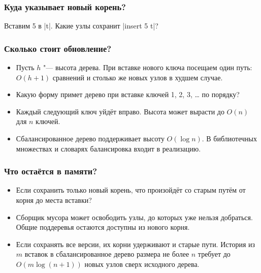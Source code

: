 \documentclass[11pt]{beamer}
\begin{document}
\begin{frame}[fragile]
  \frametitle{Куда указывает новый корень?}
  Вставим 5 в \haskinline|t|. Какие узлы сохранит \haskinline|insert 5 t|?
  \begin{center}
  \end{center}
\end{frame}

\begin{frame}[fragile]
  \frametitle{Сколько стоит обновление?}
  \begin{itemize}
    \item Пусть $h$ "--- высота дерева. При вставке нового ключа посещаем один путь: $O(h+1)$ сравнений и столько же новых узлов в худшем случае.
    \item Какую форму примет дерево при вставке ключей 1, 2, 3, \ldots{} по порядку? \pause
    \item Каждый следующий ключ уйдёт вправо. Высота может вырасти до $O(n)$ для $n$ ключей.
    \item Сбалансированное дерево поддерживает высоту $O(\log n)$. В библиотечных множествах и словарях балансировка входит в реализацию.
  \end{itemize}
\end{frame}

\begin{frame}[fragile]
  \frametitle{Что остаётся в памяти?}
  \begin{itemize}
    \item Если сохранить только новый корень, что произойдёт со старым путём от корня до места вставки? \pause
    \item Сборщик мусора может освободить узлы, до которых уже нельзя добраться. Общие поддеревья остаются доступны из нового корня.
    \item Если сохранять все версии, их корни удерживают и старые пути. История из $m$ вставок в сбалансированное дерево размера не более $n$ требует до $O(m\log(n+1))$ новых узлов сверх исходного дерева.
  \end{itemize}
\end{frame}
\end{document}
